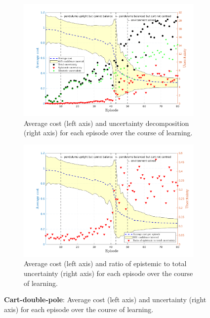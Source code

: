  
\begin{figure}[htbp]    
  \begin{subfigure}[b]{1\linewidth}
    \centering
    \includegraphics[height=0.4\textheight,width=1\textwidth]{Chapter3/Figures/cdp_uncertainty.png}
    \caption{Average cost (left axis) and uncertainty decomposition (right axis) for each episode over the course of learning.} 
    \label{Fig:Re-cdp-uncertainty} 
  \end{subfigure} 
  \begin{subfigure}[b]{1\linewidth}
    \centering
    \includegraphics[height=0.4\textheight,width=1\textwidth]{Chapter3/Figures/cdp_uncertainty_normalised.png} 
    \caption{Average cost (left axis) and ratio of epistemic to total uncertainty (right axis) for each episode over the course of learning.} 
    \label{Fig:Re-cdp-uncertainty-normalised} 
  \end{subfigure} 
\caption[Uncertainty decomposition for \textbf{cart-double-pole} environment]{\textbf{Cart-double-pole}: Average cost (left axis) and uncertainty (right axis) for each episode over the course of learning.}
\label{Fig:Re-cdp-full-uncertainty} 
\end{figure}

